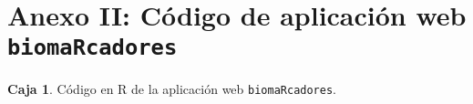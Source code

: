 \section*{Anexo II: Código de aplicación web \texttt{biomaRcadores}}\label{anexo2}

\textbf{Caja 1}. Código en R de la aplicación web \texttt{biomaRcadores}.

